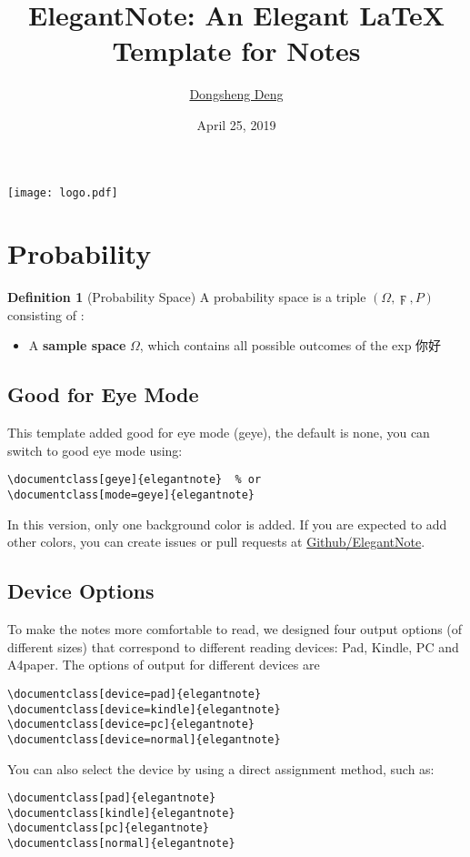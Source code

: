 \documentclass[geye,green,pad,en]{elegantnote}
\title{ElegantNote: An Elegant \LaTeX{} Template for Notes}
\author{\href{https://ddswhu.me/}{Dongsheng Deng}}
\institute{\href{https://elegantlatex.org/}{Elegant\LaTeX{} Program}}
\date{April 25, 2019}
\begin{document}
\maketitle
\centerline{\texttt{[image: logo.pdf]}}

\section{Probability}
\textbf{Definition 1} (Probability Space) A probability space is a 
triple $(\Omega, \digamma, P)$ consisting of : 
\begin{itemize}
\item A \textbf{sample space} $\Omega$, which contains all possible outcomes
of the exp 你好
\end{itemize}

\subsection{Good for Eye Mode}
This template added good for eye mode (geye), the default is none, you can switch to good eye mode using:
\begin{lstlisting}[frame=none]  
\documentclass[geye]{elegantnote}  % or
\documentclass[mode=geye]{elegantnote}
\end{lstlisting}

\begin{remark}
In this version, only one background color is added. If you are expected to add other colors, you can create issues or pull requests at \href{https://github.com/ElegantLaTeX/ElegantNote}{Github/ElegantNote}.
\end{remark}

\subsection{Device Options}

To make the notes more comfortable to read, we designed four output options (of different sizes) that correspond to different reading devices: Pad, Kindle, PC and A4paper. The options of output for different devices are
\begin{lstlisting}[frame=none]  
\documentclass[device=pad]{elegantnote}
\documentclass[device=kindle]{elegantnote}
\documentclass[device=pc]{elegantnote}
\documentclass[device=normal]{elegantnote}
\end{lstlisting}
\begin{note}
You can also select the device by using a direct assignment method, such as:
\end{note}
\begin{lstlisting}[frame=none]  
\documentclass[pad]{elegantnote}
\documentclass[kindle]{elegantnote}
\documentclass[pc]{elegantnote}
\documentclass[normal]{elegantnote}
\end{lstlisting}
\end{document}
